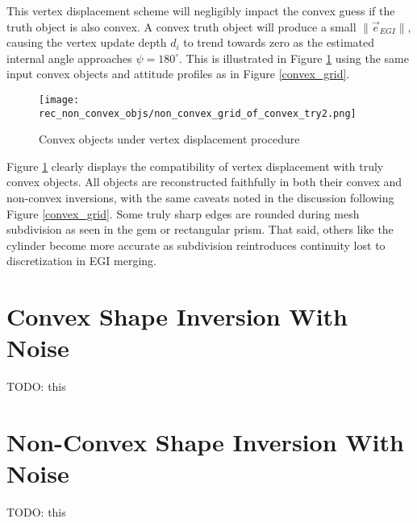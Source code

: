 This vertex displacement scheme will negligibly impact the convex guess if the truth object is also convex. A convex truth object will produce a small $\|\vec{e}_{EGI}\|$, causing the vertex update depth $d_{i}$ to trend towards zero as the estimated internal angle approaches $\psi = 180^\circ$. This is illustrated in Figure \ref{fig:non_convex_recon_of_convex} using the same input convex objects and attitude profiles as in Figure \ref{convex_grid}.

\begin{figure}[!htb]
  \centering
  \texttt{[image: rec\_non\_convex\_objs/non\_convex\_grid\_of\_convex\_try2.png]}
  \caption{Convex objects under vertex displacement procedure}
  \label{fig:non_convex_recon_of_convex}
\end{figure}

Figure \ref{fig:non_convex_recon_of_convex} clearly displays the compatibility of vertex displacement with truly convex objects. All objects are reconstructed faithfully in both their convex and non-convex inversions, with the same caveats noted in the discussion following Figure \ref{convex_grid}. Some truly sharp edges are rounded during mesh subdivision as seen in the gem or rectangular prism. That said, others like the cylinder become more accurate as subdivision reintroduces continuity lost to discretization in EGI merging.

\section{Convex Shape Inversion With Noise}

TODO: this

\section{Non-Convex Shape Inversion With Noise}

TODO: this

